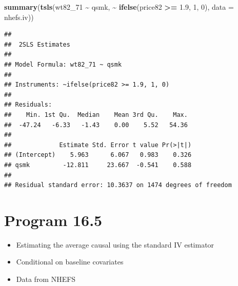 \documentclass[
  10pt,
]{book}
\newenvironment{Shaded}{\begin{snugshade}}{\end{snugshade}}
\newcommand{\DataTypeTok}[1]{\textcolor[rgb]{0.13,0.29,0.53}{#1}}
\newcommand{\DecValTok}[1]{\textcolor[rgb]{0.00,0.00,0.81}{#1}}
\newcommand{\FloatTok}[1]{\textcolor[rgb]{0.00,0.00,0.81}{#1}}
\newcommand{\KeywordTok}[1]{\textcolor[rgb]{0.13,0.29,0.53}{\textbf{#1}}}
\newcommand{\NormalTok}[1]{#1}
\newcommand{\OperatorTok}[1]{\textcolor[rgb]{0.81,0.36,0.00}{\textbf{#1}}}
\newcommand{\StringTok}[1]{\textcolor[rgb]{0.31,0.60,0.02}{#1}}
\providecommand{\tightlist}{%
  \setlength{\itemsep}{0pt}\setlength{\parskip}{0pt}}
\begin{document}
\begin{Shaded}
\begin{Highlighting}[]
\KeywordTok{summary}\NormalTok{(}\KeywordTok{tsls}\NormalTok{(wt82\_}\DecValTok{71} \OperatorTok{\textasciitilde{}}\StringTok{ }\NormalTok{qsmk, }\OperatorTok{\textasciitilde{}}\StringTok{ }\KeywordTok{ifelse}\NormalTok{(price82 }\OperatorTok{\textgreater{}=}\StringTok{ }\FloatTok{1.9}\NormalTok{, }\DecValTok{1}\NormalTok{, }\DecValTok{0}\NormalTok{), }\DataTypeTok{data =}\NormalTok{ nhefs.iv))}
\end{Highlighting}
\end{Shaded}

\begin{verbatim}
## 
##  2SLS Estimates
## 
## Model Formula: wt82_71 ~ qsmk
## 
## Instruments: ~ifelse(price82 >= 1.9, 1, 0)
## 
## Residuals:
##    Min. 1st Qu.  Median    Mean 3rd Qu.    Max. 
##  -47.24   -6.33   -1.43    0.00    5.52   54.36 
## 
##             Estimate Std. Error t value Pr(>|t|)
## (Intercept)    5.963      6.067   0.983    0.326
## qsmk         -12.811     23.667  -0.541    0.588
## 
## Residual standard error: 10.3637 on 1474 degrees of freedom
\end{verbatim}

\hypertarget{program-16.5}{%
\section{Program 16.5}\label{program-16.5}}

\begin{itemize}
\tightlist
\item
  Estimating the average causal using the standard IV estimator
\item
  Conditional on baseline covariates
\item
  Data from NHEFS
\end{itemize}
\end{document}
